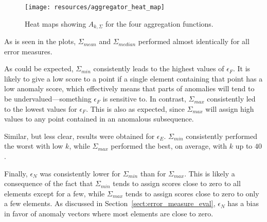
\begin{figure}[!ht]
    \begin{center}
        \texttt{[image: resources/aggregator\_heat\_map]}
    \end{center}
    \caption{\small{Heat maps showing $A_{k, \Sigma}$ for the four aggregation functions.}}
\label{fig:aggregator_heat_map}
\end{figure}

As is seen in the plots, $\Sigma_{mean}$ and $\Sigma_{median}$ performed almost identically for all error measures.

As could be expected, $\Sigma_{min}$ consistently leads to the highest values of $\epsilon_F$. It is likely to give a low score to a point if a single element containing that point has a low anomaly score, which effectively means that parts of anomalies will tend to be undervalued---something $\epsilon_F$ is sensitive to. In contrast, $\Sigma_{max}$ consistently led to the lowest values for $\epsilon_F$. This is also as expected, since $\Sigma_{max}$ will assign high values to any point contained in an anomalous subsequence.

Similar, but less clear, results were obtained for $\epsilon_E$. $\Sigma_{min}$ consistently performed the worst with low $k$, while $\Sigma_{max}$ performed the best, on average, with $k$ up to $40$.

Finally, $\epsilon_N$ was consistently lower for $\Sigma_{min}$ than for $\Sigma_{max}$. This is likely a consequence of the fact that $\Sigma_{min}$ tends to assign scores close to zero to all elements except for a few, while $\Sigma_{max}$ tends to assign scores close to zero to only a few elements. As discussed in Section~\ref{sect:error_measure_eval}, $\epsilon_N$ has a bias in favor of anomaly vectors where most elements are close to zero.

